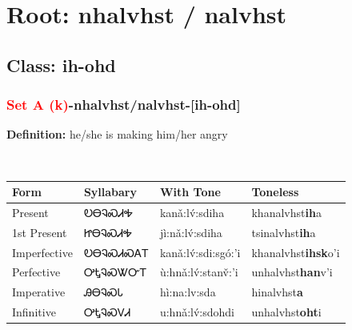 \needspace{4in}
\section*{Root: nhalvhst / nalvhst}
\nopagebreak
{}
\needspace{3in}
\subsection*{Class: ih-ohd}
\nopagebreak
\needspace{2in}
\subsubsection*{\textcolor{Red}{Set A (k)}{-}\textbf{nhalvhst/nalvhst}{-}[ih-ohd]}
\nopagebreak
\textbf{Definition: } he/she is making him/her angry
\\[0.5em]
\begin{tabularx}{\textwidth}{l X X X}%
\toprule%
\textbf{Form}&\textbf{Syllabary}&\textbf{With Tone}&\textbf{Toneless}\\%
\midrule%
Present&ᎧᎾᎸᏍᏗᎭ&kanǎ:lv́:sdiha&khanalvhst\textbf{ih}a\\%
1st Present&ᏥᎾᎸᏍᏗᎭ&jì:nǎ:lv́:sdiha&tsinalvhst\textbf{ih}a\\%
Imperfective&ᎧᎾᎸᏍᏗᏍᎪᎢ&kanǎ:lv́:sdi:sgó:’i&khanalvhst\textbf{ihsk}o'i\\%
Perfective&ᎤᎿᎸᏍᏔᏅᎢ&ù:hnǎ:lv́:stanv̌:’i&unhalvhst\textbf{han}v'i\\%
Imperative&ᎯᎾᎸᏍᏓ&hì:na:lv:sda&hinalvhst\textbf{a}\\%
Infinitive&ᎤᎿᎸᏍᏙᏗ&u:hnǎ:lv́:sdohdi&unhalvhst\textbf{oht}i\\%
\bottomrule%
\end{tabularx}
\\[1em]